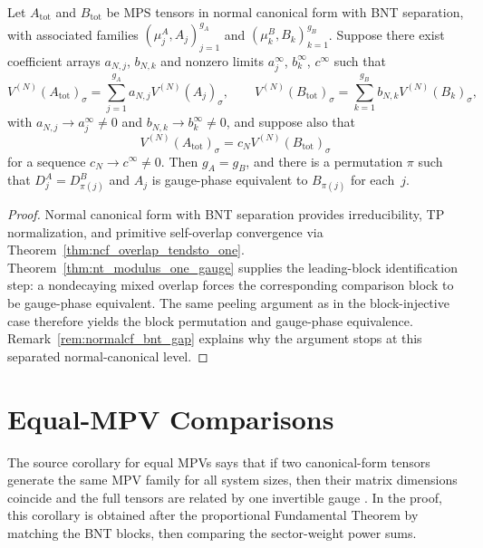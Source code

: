 \begin{lemma}\label{lem:ft_proportional_nt}
		\leanok
		Let $A_{\mathrm{tot}}$ and $B_{\mathrm{tot}}$ be MPS tensors
		in normal canonical form with BNT separation, with associated families
		$(\mu_j^A, A_j)_{j=1}^{g_A}$ and $(\mu_k^B, B_k)_{k=1}^{g_B}$.
		Suppose there exist coefficient arrays $a_{N,j}$, $b_{N,k}$ and
		nonzero limits $a_j^\infty$, $b_k^\infty$, $c^\infty$ such that
		\[
			V^{(N)}(A_{\mathrm{tot}})_\sigma
			= \sum_{j=1}^{g_A} a_{N,j} V^{(N)}(A_j)_\sigma,
			\qquad
			V^{(N)}(B_{\mathrm{tot}})_\sigma
			= \sum_{k=1}^{g_B} b_{N,k} V^{(N)}(B_k)_\sigma,
		\]
		with $a_{N,j} \to a_j^\infty \neq 0$ and
		$b_{N,k} \to b_k^\infty \neq 0$, and suppose also that
		\[
			V^{(N)}(A_{\mathrm{tot}})_\sigma
			= c_N V^{(N)}(B_{\mathrm{tot}})_\sigma
		\]
		for a sequence $c_N \to c^\infty \neq 0$.
		Then $g_A = g_B$, and there is a permutation $\pi$ such that
		$D_j^A = D_{\pi(j)}^B$ and $A_j$ is gauge-phase equivalent to
		$B_{\pi(j)}$ for each~$j$.
\end{lemma}

\begin{proof}\leanok
		Normal canonical form with BNT separation provides irreducibility,
		TP normalization, and primitive self-overlap convergence via
		Theorem~\ref{thm:ncf_overlap_tendsto_one}.
		Theorem~\ref{thm:nt_modulus_one_gauge} supplies the leading-block
		identification step: a nondecaying mixed overlap forces the
		corresponding comparison block to be gauge-phase equivalent.
		The same peeling argument as in the block-injective case therefore
		yields the block permutation and gauge-phase equivalence.
		Remark~\ref{rem:normalcf_bnt_gap} explains why the argument stops at
		this separated normal-canonical level.
\end{proof}

\section{Equal-MPV Comparisons}%
\label{sec:assembly_equal}

The source corollary for equal MPVs says that if two canonical-form tensors
generate the same MPV family for all system sizes, then their matrix dimensions
coincide and the full tensors are related by one invertible gauge
\cite[Corollary~II.2]{Cirac2017MPDO_AnnPhys}. In the proof, this corollary is
obtained after the proportional Fundamental Theorem by matching the BNT blocks,
then comparing the sector-weight power sums.

